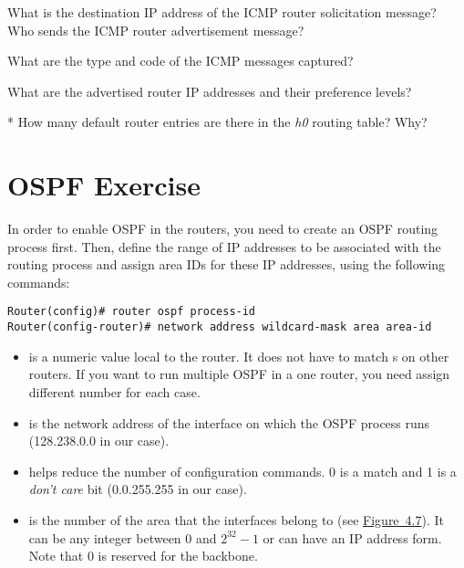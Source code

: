 \documentclass{../UTNetLab}
\begin{document}
\begin{report}
    \item What is the destination IP address of the ICMP router solicitation message? Who sends the ICMP router advertisement message?
    \item What are the type and code of the ICMP messages captured?
    \item What are the advertised router IP addresses and their preference levels?
    \item [*] How many default router entries are there in the \textit{h0} routing table? Why?
\end{report}

\part{OSPF Exercise}\label{sec:ospf}
In order to enable OSPF in the routers, you need to create an OSPF routing process first.
Then, define the range of IP addresses to be associated with the routing process and assign area IDs for these IP addresses, using the following commands:
\begin{lstlisting}[language={cisco}, emph={process-id, area-id, address, wildcard-mask}]
Router(config)# router ospf process-id
Router(config-router)# network address wildcard-mask area area-id
    \end{lstlisting}

\begin{itemize}
    \item {} is a numeric value local to the router.
          It does not have to match s on other routers.
          If you want to run multiple OSPF in a one router, you need assign different number for each case.

    \item {} is the network address of the interface on which the OSPF process runs (128.238.0.0 in our case).

    \item {} helps reduce the number of configuration commands.
          0 is a match and 1 is a \textit{don’t care} bit (0.0.255.255 in our case).

    \item {} is the number of the area that the interfaces belong to (see \hyperref[fig:4.7]{Figure~4.7}).
          It can be any integer between 0 and $2^{32} - 1$ or can have an IP address form.
          Note that 0 is reserved for the backbone.
\end{itemize}
\end{document}
